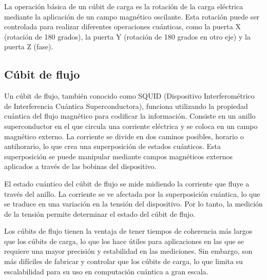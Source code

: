 \documentclass[11pt]{article}
\begin{document}
La operación básica de un cúbit de carga es la rotación de la carga eléctrica mediante la aplicación de un campo magnético oscilante. Esta rotación puede ser controlada para realizar diferentes operaciones cuánticas, como la puerta X (rotación de 180 grados), la puerta Y (rotación de 180 grados en otro eje) y la puerta Z (fase). 
%
\subsection{Cúbit de flujo}

Un cúbit de flujo, también conocido como SQUID (Dispositivo Interferométrico de Interferencia Cuántica Superconductora), funciona utilizando la propiedad cuántica del flujo magnético para codificar la información. Consiste en un anillo superconductor en el que circula una corriente eléctrica y se coloca en un campo magnético externo. La corriente se divide en dos caminos posibles, horario o antihorario, lo que crea una superposición de estados cuánticos. Esta superposición se puede manipular mediante campos magnéticos externos aplicados a través de las bobinas del dispositivo.

El estado cuántico del cúbit de flujo se mide midiendo la corriente que fluye a través del anillo. La corriente se ve afectada por la superposición cuántica, lo que se traduce en una variación en la tensión del dispositivo. Por lo tanto, la medición de la tensión permite determinar el estado del cúbit de flujo.

Los cúbits de flujo tienen la ventaja de tener tiempos de coherencia más largos que los cúbits de carga, lo que los hace útiles para aplicaciones en las que se requiere una mayor precisión y estabilidad en las mediciones. Sin embargo, son más difíciles de fabricar y controlar que los cúbits de carga, lo que limita su escalabilidad para su uso en computación cuántica a gran escala.
%
\end{document}
